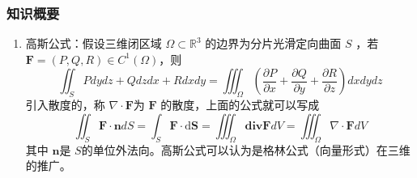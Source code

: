 \subsubsection{知识概要}
\begin{enumerate}
    \item 高斯公式：假设三维闭区域 $\Omega \subset \mathbb{R}^3$ 的边界为分片光滑定向曲面 $S$ ，若 $\mathbf{F} = (P, Q, R) \in C^1(\Omega)$，则
    \[
        \iint_SPdydz+Qdzdx+Rdxdy=\iiint_\Omega\left(\frac{\partial P}{\partial x}+\frac{\partial Q}{\partial y}+\frac{\partial R}{\partial z}\right)dxdydz
    \]
    引入散度的，称 $\nabla \cdot \mathbf{F}$为 $\mathbf{F}$ 的散度，上面的公式就可以写成
    \[
        \iint_S\mathbf{F}\cdot\mathbf{n}dS
        = \int _S \mathbf{F}\cdot \mathrm{d} \mathbf{S}
        =\iiint_\Omega\mathbf{div}\mathbf{F}dV = \iiint_\Omega \nabla \cdot  \mathbf{F}dV
    \]
    其中 $\mathbf{n}$是 $S$的单位外法向。高斯公式可以认为是格林公式（向量形式）在三维的推广。


\end{enumerate}
